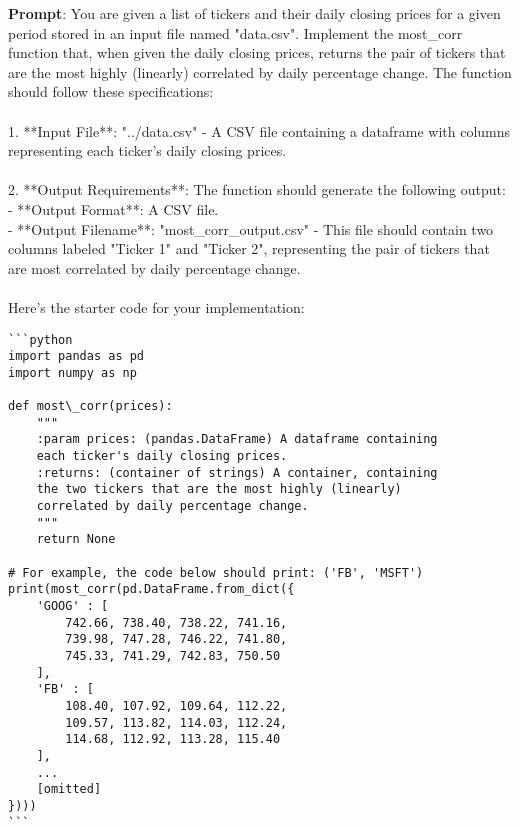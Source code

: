 \onecolumn
\begin{tcolorbox}[colback=blue!5!white, colframe=blue!75!black, title=Successful case \#1 from Claude-3-5-sonnet-20240620, text width=\textwidth]
\textbf{Prompt}: You are given a list of tickers and their daily closing prices for a given period stored in an input file named "data.csv". Implement the most\_corr function that, when given the daily closing prices, returns the pair of tickers that are the most highly (linearly) correlated by daily percentage change. The function should follow these specifications:\\
\\
1. **Input File**: "../data.csv" - A CSV file containing a dataframe with columns representing each ticker's daily closing prices.\\
\\
2. **Output Requirements**: The function should generate the following output:\\
   - **Output Format**: A CSV file.\\
   - **Output Filename**: "most\_corr\_output.csv" - This file should contain two columns labeled "Ticker 1" and "Ticker 2", representing the pair of tickers that are most correlated by daily percentage change.\\
\\
Here's the starter code for your implementation:\\
\begin{verbatim}
```python
import pandas as pd
import numpy as np

def most\_corr(prices):
    """
    :param prices: (pandas.DataFrame) A dataframe containing
    each ticker's daily closing prices.
    :returns: (container of strings) A container, containing
    the two tickers that are the most highly (linearly)
    correlated by daily percentage change.
    """
    return None

# For example, the code below should print: ('FB', 'MSFT')
print(most_corr(pd.DataFrame.from_dict({
    'GOOG' : [
        742.66, 738.40, 738.22, 741.16,
        739.98, 747.28, 746.22, 741.80,
        745.33, 741.29, 742.83, 750.50
    ],
    'FB' : [
        108.40, 107.92, 109.64, 112.22,
        109.57, 113.82, 114.03, 112.24,
        114.68, 112.92, 113.28, 115.40
    ],
    ...
    [omitted]
}))) 
```
\end{verbatim}
\end{tcolorbox}
